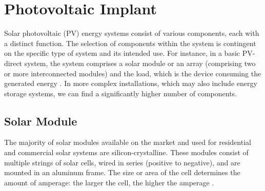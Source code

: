\section{Photovoltaic Implant}\label{sec:pv}


Solar photovoltaic (PV) energy systems consist of various components, each with a distinct function. The selection of components within the system is contingent on the specific type of system and its intended use. For instance, in a basic PV-direct system, the system comprises a solar module or an array (comprising two or more interconnected modules) and the load, which is the device consuming the generated energy \cite{pvarizona}.
In more complex installations, which may also include energy storage systems, we can find a significantly higher number of components.


\subsection{Solar Module}
The majority of solar modules available on the market and
used for residential and commercial solar systems are silicon-crystalline. These modules consist of multiple strings of solar
cells, wired in series (positive to negative), and are mounted
in an aluminum frame. The size or area of
the cell determines the amount of amperage: the larger the
cell, the higher the amperage \cite{pvarizona}.

